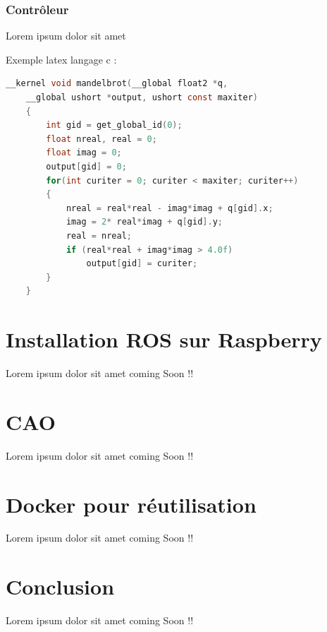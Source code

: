 \documentclass[12pt, openany]{report}
\begin{document}
\subsubsection{Contrôleur}
Lorem ipsum dolor sit amet

Exemple latex langage c :
\begin{lstlisting}[language=C]
    __kernel void mandelbrot(__global float2 *q, 
    __global ushort *output, ushort const maxiter)
    {
        int gid = get_global_id(0);
        float nreal, real = 0;
        float imag = 0;
        output[gid] = 0;
        for(int curiter = 0; curiter < maxiter; curiter++) 
        {
            nreal = real*real - imag*imag + q[gid].x;
            imag = 2* real*imag + q[gid].y;
            real = nreal;
            if (real*real + imag*imag > 4.0f)
                output[gid] = curiter;
        }
    }
\end{lstlisting}

\section{Installation ROS sur Raspberry}
Lorem ipsum dolor sit amet
coming Soon !!

\section{CAO}
Lorem ipsum dolor sit amet
coming Soon !!

\section{Docker pour réutilisation}
Lorem ipsum dolor sit amet
coming Soon !!

\section{Conclusion}
Lorem ipsum dolor sit amet
coming Soon !!
\end{document}
